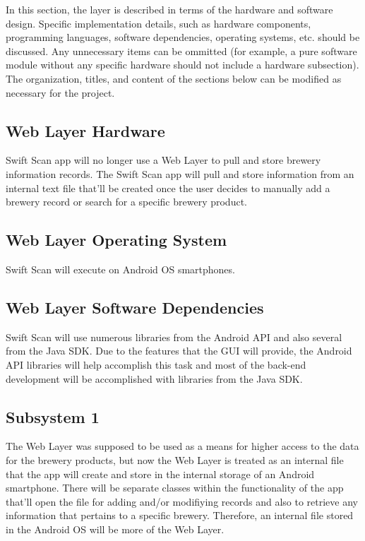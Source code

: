In this section, the layer is described in terms of the hardware and software design. Specific implementation details, such as hardware components, programming languages, software dependencies, operating systems, etc. should be discussed. Any unnecessary items can be ommitted (for example, a pure software module without any specific hardware should not include a hardware subsection). The organization, titles, and content of the sections below can be modified as necessary for the project.

\subsection{Web Layer Hardware}
Swift Scan app will no longer use a Web Layer to pull and store brewery information records.  The Swift Scan app will pull and store information from an internal text file that'll be created once the user decides to manually add a brewery record or search for a specific brewery product.

\subsection{Web Layer Operating System}
Swift Scan will execute on Android OS smartphones.

\subsection{Web Layer Software Dependencies}
Swift Scan will use numerous libraries from the Android API and also several from the Java SDK.  Due to the features that the GUI will provide, the Android API libraries will help accomplish this task and most of the back-end development will be accomplished with libraries from the Java SDK.

\subsection{Subsystem 1}
The Web Layer was supposed to be used as a means for higher access to the data for the brewery products, but now the Web Layer is treated as an internal file that the app will create and store in the internal storage of an Android smartphone.  There will be separate classes within the functionality of the app that'll open the file for adding and/or modifiying records and also to retrieve any information that pertains to a specific brewery.  Therefore, an internal file stored in the Android OS will be more of the Web Layer.

